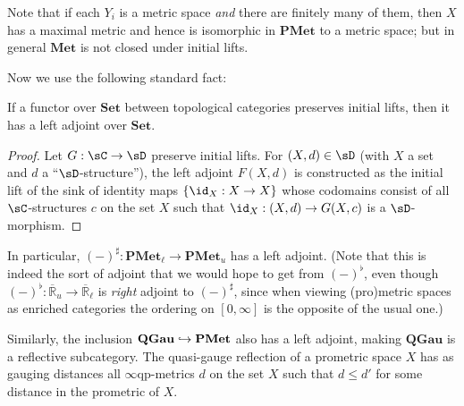 \documentclass{article}
\def\Q{\mathbb{Q}}
\def\R{\mathbb{R}}
\def\Re{\overline{\R}}
\def\Rp{[0,\infty]}
\def\Reu{\Re_u}
\def\Rel{\Re_{\ell}}
\def\upp#1{{#1}^{\sharp}}
\def\low#1{{#1}^{\flat}}
\def\eqp{$\infty$qp}
\def\Set{\mathbf{Set}}
\def\PMet{\mathbf{PMet}}
\def\QGau{\mathbf{QGau}}
\def\Met{\mathbf{Met}}
\def\PMetu{\mathbf{PMet}_u}
\def\PMetl{\mathbf{PMet}_\ell}
\begin{document}
Note that if each $Y_i$ is a metric space \emph{and} there are finitely many of them, then $X$ has a maximal metric and hence is isomorphic in $\PMet$ to a metric space; but in general $\Met$ is not closed under initial lifts.

Now we use the following standard fact:

\begin{thm}
  If a functor over $\Set$ between topological categories preserves initial lifts, then it has a left adjoint over $\Set$.
\end{thm}
\begin{proof}
  Let $G:\sC\to\sD$ preserve initial lifts.
  For $(X,d)\in\sD$ (with $X$ a set and $d$ a ``$\sD$-structure''), the left adjoint $F(X,d)$ is constructed as the initial lift of the sink of identity maps $\{ \id_X : X\to X \}$ whose codomains consist of all $\sC$-structures $c$ on the set $X$ such that $\id_X : (X,d) \to G(X,c)$ is a $\sD$-morphism.
\end{proof}

In particular, $\upp{(-)} : \PMetl \to\PMetu$ has a left adjoint.
(Note that this is indeed the sort of adjoint that we would hope to get from $\low{(-)}$, even though $\low{(-)}:\Reu \to \Rel$  is \emph{right} adjoint to $\upp{(-)}$, since when viewing (pro)metric spaces as enriched categories the ordering on $\Rp$ is the opposite of the usual one.)

Similarly, the inclusion $\QGau\into\PMet$ also has a left adjoint, making $\QGau$ is a reflective subcategory.
The quasi-gauge reflection of a prometric space $X$ has as gauging distances all \eqp-metrics $d$ on the set $X$ such that $d\le d'$ for some distance in the prometric of $X$.

\end{document}
